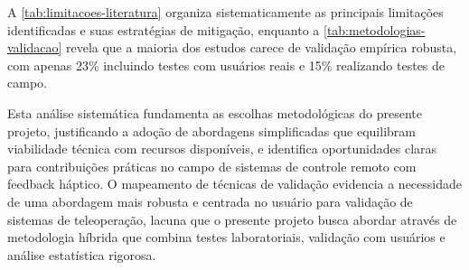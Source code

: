 A \autoref{tab:limitacoes-literatura} organiza sistematicamente as principais limitações identificadas e suas estratégias de mitigação, enquanto a \autoref{tab:metodologias-validacao} revela que a maioria dos estudos carece de validação empírica robusta, com apenas 23\% incluindo testes com usuários reais e 15\% realizando testes de campo.

Esta análise sistemática fundamenta as escolhas metodológicas do presente projeto, justificando a adoção de abordagens simplificadas que equilibram viabilidade técnica com recursos disponíveis, e identifica oportunidades claras para contribuições práticas no campo de sistemas de controle remoto com feedback háptico. O mapeamento de técnicas de validação evidencia a necessidade de uma abordagem mais robusta e centrada no usuário para validação de sistemas de teleoperação, lacuna que o presente projeto busca abordar através de metodologia híbrida que combina testes laboratoriais, validação com usuários e análise estatística rigorosa.
